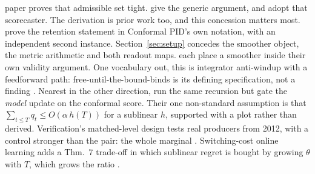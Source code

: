 paper proves that admissible set tight. \citet[Appendix~A]{dupuy2026relevance} give
the generic argument, and \citet{duerst2024calibrating} adopt that scorecaster. The derivation is
prior work too, and this concession matters most. \citet[Corollary~2]{li2025o2cp} prove the
retention statement in Conformal PID's own notation, with \citet{wang2026acmcp} an independent
second instance. Section~\ref{sec:setup} concedes the smoother object, the metric arithmetic and
both readout maps. \citet{zheng2025scdsplit,wu2025eci,chen2023ipoc,lade2026bcaci} each place a
smoother inside their own validity argument. One vocabulary out, this is integrator anti-windup
with a feedforward path: free-until-the-bound-binds is its defining specification, not a finding
\citep{galeani2009antiwindup}. Nearest in the other direction, \citet{gao2025coloke} run the same
recursion but gate the \emph{model} update on the conformal score. Their one non-standard
assumption is that $\sum_{t \le T} q_t \le O(\alpha\,h(T))$ for a sublinear $h$, supported with a
plot rather than derived. Verification's matched-level design tests real producers from 2012, with
a control stronger than the pair: the whole marginal
\citep{pinson2012scenarios,worsnop2018scenarios}. Switching-cost online learning adds a Thm.~7
trade-off in which sublinear regret is bought by growing $\theta$ with $T$, which grows the ratio
\citep[Thm.~7]{andrew2013twometrics}.

